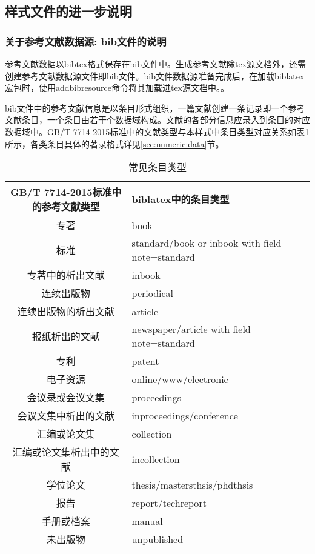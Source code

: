 \subsection{样式文件的进一步说明}

\subsubsection{关于参考文献数据源: bib文件的说明}\label{sec:bib:bibtex}

参考文献数据以bibtex格式保存在bib文件中。生成参考文献除tex源文档外，还需创建参考文献数据源文件即bib文件。bib文件数据源准备完成后，在加载biblatex宏包时，使用addbibresource命令将其加载进tex源文档中。。

bib文件中的参考文献信息是以条目形式组织，一篇文献创建一条记录即一个参考文献条目，一个条目由若干个数据域构成。文献的各部分信息应录入到条目的对应数据域中。GB/T 7714-2015标准中的文献类型与本样式中条目类型对应关系如表\ref{tab:entrytypes}所示，各类条目具体的著录格式详见\ref{sec:numeric:data}节。
\begin{table}[!htb]
\centering
\caption{常见条目类型}\label{tab:entrytypes}
\begin{tabular}{cl}
\hline
  GB/T 7714-2015标准中的参考文献类型 &  biblatex中的条目类型\\ \hline
  专著& book\\
  标准& standard/book or inbook with field note=standard\\
  专著中的析出文献& inbook\\
  连续出版物& periodical\\
  连续出版物的析出文献& article\\
  报纸析出的文献& newspaper/article with field note=standard\\
  专利& patent\\
  电子资源& online/www/electronic\\
  会议录或会议文集& proceedings\\
  会议文集中析出的文献& inproceedings/conference\\
  汇编或论文集& collection\\
  汇编或论文集析出中的文献& incollection\\
  学位论文& thesis/mastersthsis/phdthsis\\
  报告& report/techreport\\
  手册或档案& manual\\
  未出版物& unpublished\\ \hline
  \end{tabular}
\end{table}


